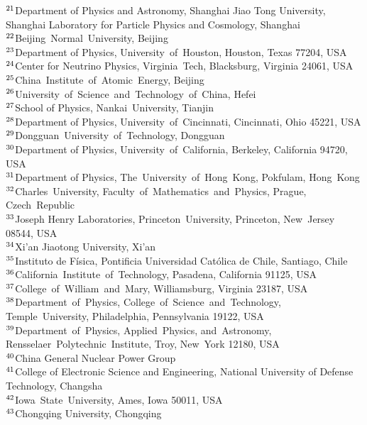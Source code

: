{$^{21}$Department of Physics and Astronomy, Shanghai Jiao Tong University, Shanghai Laboratory for Particle Physics and Cosmology, Shanghai \\ 
$^{22}$Beijing~Normal~University, Beijing \\ 
$^{23}$Department of Physics, University~of~Houston, Houston, Texas  77204, USA \\ 
$^{24}$Center for Neutrino Physics, Virginia~Tech, Blacksburg, Virginia  24061, USA \\ 
$^{25}$China~Institute~of~Atomic~Energy, Beijing \\ 
$^{26}$University~of~Science~and~Technology~of~China, Hefei \\ 
$^{27}$School of Physics, Nankai~University, Tianjin \\ 
$^{28}$Department of Physics, University~of~Cincinnati, Cincinnati, Ohio 45221, USA \\ 
$^{29}$Dongguan~University~of~Technology, Dongguan \\ 
$^{30}$Department of Physics, University~of~California, Berkeley, California  94720, USA \\ 
$^{31}$Department of Physics, The~University~of~Hong~Kong, Pokfulam, Hong~Kong \\ 
$^{32}$Charles~University, Faculty~of~Mathematics~and~Physics, Prague, Czech~Republic \\ 
$^{33}$Joseph Henry Laboratories, Princeton~University, Princeton, New~Jersey 08544, USA \\ 
$^{34}$Xi'an Jiaotong University, Xi'an \\ 
$^{35}$Instituto de F\'isica, Pontificia Universidad Cat\'olica de Chile, Santiago, Chile \\ 
$^{36}$California~Institute~of~Technology, Pasadena, California 91125, USA \\ 
$^{37}$College~of~William~and~Mary, Williamsburg, Virginia  23187, USA \\ 
$^{38}$Department~of~Physics, College~of~Science~and~Technology, Temple~University, Philadelphia, Pennsylvania  19122, USA \\ 
$^{39}$Department~of~Physics, Applied~Physics, and~Astronomy, Rensselaer~Polytechnic~Institute, Troy, New~York  12180, USA \\ 
$^{40}$China General Nuclear Power Group \\ 
$^{41}$College of Electronic Science and Engineering, National University of Defense Technology, Changsha \\ 
$^{42}$Iowa~State~University, Ames, Iowa  50011, USA \\ 
$^{43}$Chongqing University, Chongqing \\ 
} 
